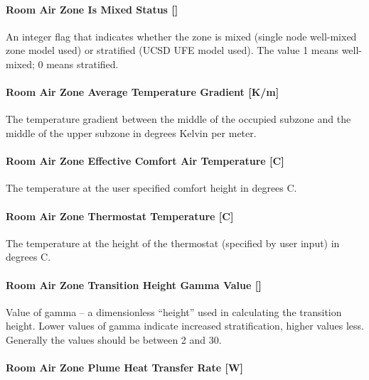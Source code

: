 \paragraph{Room Air Zone Is Mixed Status {[]}}\label{room-air-zone-is-mixed-status-1-2}

An integer flag that indicates whether the zone is mixed (single node well-mixed zone model used) or stratified (UCSD UFE model used). The value 1 means well-mixed; 0 means stratified.

\paragraph{Room Air Zone Average Temperature Gradient {[}K/m{]}}\label{room-air-zone-average-temperature-gradient-km-1-2}

The temperature gradient between the middle of the occupied subzone and the middle of the upper subzone in degrees Kelvin per meter.

\paragraph{Room Air Zone Effective Comfort Air Temperature {[}C{]}}\label{room-air-zone-effective-comfort-air-temperature-c-2}

The temperature at the user specified comfort height in degrees C.

\paragraph{Room Air Zone Thermostat Temperature {[}C{]}}\label{room-air-zone-thermostat-temperature-c-1-2}

The temperature at the height of the thermostat (specified by user input) in degrees C.

\paragraph{Room Air Zone Transition Height Gamma Value {[]}}\label{room-air-zone-transition-height-gamma-value-2}

Value of gamma -- a dimensionless ``height'' used in calculating the transition height. Lower values of gamma indicate increased stratification, higher values less. Generally the values should be between 2 and 30.

\paragraph{Room Air Zone Plume Heat Transfer Rate {[}W{]}}\label{room-air-zone-plume-heat-transfer-rate-w-2}

